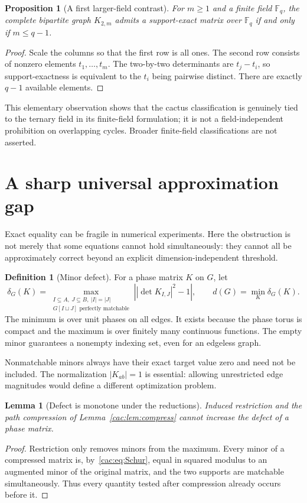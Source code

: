 \documentclass[11pt]{article}
\numberwithin{equation}{section}
\newtheorem{lemma}[theorem]{Lemma}
\newtheorem{proposition}[theorem]{Proposition}
\theoremstyle{definition}
\newtheorem{definition}[theorem]{Definition}
\newcommand{\F}{\mathbb F}
\newcommand{\normsq}[1]{\left|#1\right|^2}
\begin{document}
\begin{proposition}[A first larger-field contrast]
\label{cac:prop:K2m}
For $m\ge1$ and a finite field $\F_q$, the complete bipartite graph $K_{2,m}$ admits a support-exact matrix over $\F_q$ if and only if $m\le q-1$.
\end{proposition}
\begin{proof}
Scale the columns so that the first row is all ones. The second row consists of nonzero elements $t_1,\ldots,t_m$. The two-by-two determinants are $t_j-t_i$, so support-exactness is equivalent to the $t_i$ being pairwise distinct. There are exactly $q-1$ available elements.
\end{proof}
This elementary observation shows that the cactus classification is genuinely tied to the ternary field in its finite-field formulation; it is not a field-independent prohibition on overlapping cycles. Broader finite-field classifications are not asserted.

\section{A sharp universal approximation gap}
\label{cac:sec:gap}

Exact equality can be fragile in numerical experiments. Here the obstruction is not merely that some equations cannot hold simultaneously: they cannot all be approximately correct beyond an explicit dimension-independent threshold.

\begin{definition}[Minor defect]
For a phase matrix $K$ on $G$, let
\begin{equation}
 \delta_G(K)=\max_{\substack{I\subseteq A,\ J\subseteq B,\ |I|=|J|\\
                  G[I\sqcup J]\text{ perfectly matchable}}}
                 \left|\normsq{\det K_{I,J}}-1\right|,
 \qquad
 d(G)=\min_{K}\delta_G(K).
 \label{cac:eq:defect}
\end{equation}
The minimum is over unit phases on all edges. It exists because the phase torus is compact and the maximum is over finitely many continuous functions. The empty minor guarantees a nonempty indexing set, even for an edgeless graph.
\end{definition}
Nonmatchable minors always have their exact target value zero and need not be included. The normalization $|K_{ab}|=1$ is essential: allowing unrestricted edge magnitudes would define a different optimization problem.

\begin{lemma}[Defect is monotone under the reductions]
\label{cac:lem:defectmonotone}
Induced restriction and the path compression of Lemma~\ref{cac:lem:compress} cannot increase the defect of a phase matrix.
\end{lemma}
\begin{proof}
Restriction only removes minors from the maximum. Every minor of a compressed matrix is, by~\eqref{cac:eq:Schur}, equal in squared modulus to an augmented minor of the original matrix, and the two supports are matchable simultaneously. Thus every quantity tested after compression already occurs before it.
\end{proof}
\end{document}
